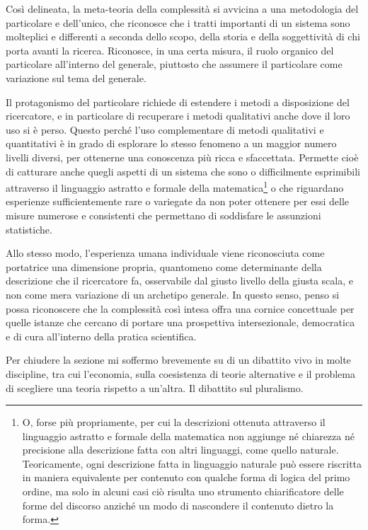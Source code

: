 \documentclass[a4paper, headings=standardclasses]{scrartcl}
\begin{document}
Così delineata, la meta-teoria della complessità si avvicina a una metodologia del particolare e dell'unico, che riconosce che i tratti importanti di un sistema sono molteplici e differenti a seconda dello scopo, della storia e della soggettività di chi porta avanti la ricerca. Riconosce, in una certa misura, il ruolo organico del particolare all'interno del generale, piuttosto che assumere il particolare come variazione sul tema del generale.

Il protagonismo del particolare richiede di estendere i metodi a disposizione del ricercatore, e in particolare di recuperare i metodi qualitativi anche dove il loro uso si è perso. Questo perché l'uso complementare di metodi qualitativi e quantitativi è in grado di esplorare lo stesso fenomeno a un maggior numero livelli diversi, per ottenerne una conoscenza più ricca e sfaccettata. Permette cioè di catturare anche quegli aspetti di un sistema che sono o difficilmente esprimibili attraverso il linguaggio astratto e formale della matematica\footnote{O, forse più propriamente, per cui la descrizioni ottenuta attraverso il linguaggio astratto e formale della matematica non aggiunge né chiarezza né precisione alla descrizione fatta con altri linguaggi, come quello naturale. Teoricamente, ogni descrizione fatta in linguaggio naturale può essere riscritta in maniera equivalente per contenuto con qualche forma di logica del primo ordine, ma solo in alcuni casi ciò risulta uno strumento chiarificatore delle forme del discorso anziché un modo di nascondere il contenuto dietro la forma.} o che riguardano esperienze sufficientemente rare o variegate da non poter ottenere per essi delle misure numerose e consistenti che permettano di soddisfare le assunzioni statistiche.

Allo stesso modo, l'esperienza umana individuale viene riconosciuta come portatrice una dimensione propria, quantomeno come determinante della descrizione che il ricercatore fa, osservabile dal giusto livello della giusta scala, e non come mera variazione di un archetipo generale.
In questo senso, penso si possa riconoscere che la complessità così intesa offra una cornice concettuale per quelle istanze che cercano di portare una prospettiva intersezionale, democratica e di cura all'interno della pratica scientifica.

Per chiudere la sezione mi soffermo brevemente su di un dibattito vivo in molte discipline, tra cui l'economia, sulla coesistenza di teorie alternative e il problema di scegliere una teoria rispetto a un'altra. Il dibattito sul pluralismo.
\end{document}
